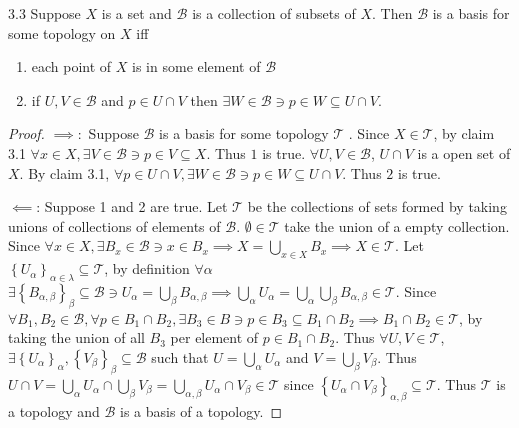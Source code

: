 \documentclass{article}
\newcommand*{\T}{\mathcal{T}}
\newcommand*{\B}{\mathcal{B}}
\begin{document}
\begin{claim}{3.3}\label{Claim 3.3.}
    Suppose $X$ is a set and $\B$ is a collection of subsets of $X$. Then $\B$ is a basis for some topology on $X$ iff 
    
    \begin{enumerate}
        \item each point of $X$ is in some element of $\B$
        \item if $U, V \in \B$ and $p \in U \cap V$ then $\exists W \in \B \ni p \in W \subseteq U \cap V$.     
    \end{enumerate}
    
\end{claim}
\begin{proof}
    $\implies:$ Suppose $\B$ is a basis for some topology $\T$ . Since $X \in \T$, by claim 3.1 $\forall x \in X, \exists V \in \B \ni p \in V \subseteq X$. Thus $1$ is true. $\forall U, V \in \B$, $U \cap V$ is a open set of $X$. By claim 3.1, $\forall p \in U \cap V, \exists W \in \B \ni p\in W \subseteq U \cap V$. Thus $2$ is true. 
    
    $\impliedby$: Suppose 1 and 2 are true. Let $\T$ be the collections of sets formed by taking unions of collections of elements of $\B$. $\emptyset \in \T$ take the union of a empty collection. Since $\forall x \in X, \exists B_x \in \B \ni x \in B_x \implies X = \bigcup_{x \in X} B_x \implies X \in \T$. Let $\left\{ U_\alpha \right\}_{\alpha \in \lambda} \subseteq \T$, by definition $\forall \alpha$ $\exists \left\{ B_{\alpha, \beta} \right\}_{\beta} \subseteq \B \ni U_\alpha = \bigcup_{\beta} B_{\alpha, \beta} \implies \bigcup_{\alpha} U_\alpha = \bigcup_{\alpha} \bigcup_{\beta} B_{\alpha, \beta}\in \T$. Since $\forall B_1, B_2 \in \B, \forall p \in B_1 \cap B_2, \exists B_3 \in B \ni p \in B_3 \subseteq B_1 \cap B_2 \implies B_1 \cap B_2 \in \T$, by taking the union of all $B_3$ per element of $p \in B_1 \cap B_2$. Thus $\forall U, V \in \T$, $\exists \left\{ U_\alpha \right\}_{\alpha}, \left\{ V_\beta \right\}_{\beta} \subseteq \B$ such that $U = \bigcup_{\alpha} U_\alpha$ and $V = \bigcup_{\beta} V_\beta$. Thus $U \cap V = \bigcup_{\alpha} U_\alpha \cap \bigcup_{\beta} V_\beta = \bigcup_{\alpha, \beta} U_{\alpha} \cap V_{\beta} \in \T$ since $\left\{ U_\alpha \cap V_{\beta} \right\}_{\alpha, \beta} \subseteq \T$. Thus $\T$ is a topology and $\B$ is a basis of a topology.             
\end{proof}

\bigskip
\end{document}
